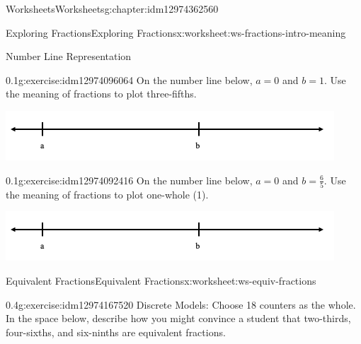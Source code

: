 \documentclass[twoside,11pt,]{book}
\begin{document}
\begin{chapterptx}{Worksheets}{}{Worksheets}{}{}{g:chapter:idm12974362560}
\begin{worksheet-section-numberless}{Exploring Fractions}{}{Exploring Fractions}{}{}{x:worksheet:ws-fractions-intro-meaning}
\begin{introduction}{}
Number Line Representation%
\end{introduction}%
\begin{divisionexercise}{9}{}{0.1}{g:exercise:idm12974096064}%
On the number line below, \(a= 0 \) and \(b=1 \).  Use the meaning of fractions to plot three-fifths.%
\begin{sidebyside}{1}{0}{0}{0}%
\begin{sbspanel}{1}%
\includegraphics[width=1\linewidth]{images/fractions-number-line.png}
\end{sbspanel}%
\end{sidebyside}%
\end{divisionexercise}%
\clearpage
\begin{divisionexercise}{10}{}{0.1}{g:exercise:idm12974092416}%
On the number line below, \(a= 0 \) and \(b=\frac{6}{5} \).  Use the meaning of fractions to plot one-whole (1).%
\begin{sidebyside}{1}{0}{0}{0}%
\begin{sbspanel}{1}%
\includegraphics[width=1\linewidth]{images/fractions-number-line.png}
\end{sbspanel}%
\end{sidebyside}%
\end{divisionexercise}%
\end{worksheet-section-numberless}
\restoregeometry
%
%
\typeout{************************************************}
\typeout{************************************************}
%
\begin{worksheet-section-numberless}{Equivalent Fractions}{}{Equivalent Fractions}{}{}{x:worksheet:ws-equiv-fractions}
\begin{divisionexercise}{1}{}{0.4}{g:exercise:idm12974167520}%
Discrete Models: Choose 18 counters as the whole. In the space below, describe how you might convince a student that two-thirds, four-sixths, and six-ninths are equivalent fractions.%
\end{divisionexercise}%

\end{worksheet-section-numberless}
\end{chapterptx}
\end{document}

